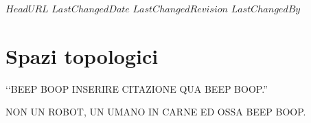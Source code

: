 \svnidlong
{$HeadURL$}
{$LastChangedDate$}
{$LastChangedRevision$}
{$LastChangedBy$}

\chapter{Spazi topologici}

\begin{introduction}
‘‘BEEP BOOP INSERIRE CITAZIONE QUA BEEP BOOP.''
\begin{flushright}
	\textsc{NON UN ROBOT,} UN UMANO IN CARNE ED OSSA BEEP BOOP.
\end{flushright}
\end{introduction}


